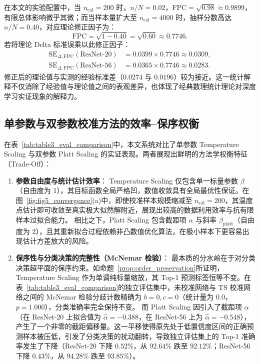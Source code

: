 在本文的实验配置中，当 $n_{\mathrm{cal}} = 200$ 时，$n/N = 0.02$，$\mathrm{FPC} = \sqrt{0.98} \approx 0.9899$，有限总体影响微乎其微；而当样本量扩大至 $n_{\mathrm{cal}} = 4000$ 时，抽样分数高达 $n/N = 0.40$，对应理论修正因子为：
\[
\mathrm{FPC} = \sqrt{1 - 0.40} = \sqrt{0.60} \approx 0.7746.
\]
若将理论 Delta 标准误乘以此修正因子：
\begin{align*}
\mathrm{SE}_{\Delta, \mathrm{FPC}}(\text{ResNet-20}) &= 0.0399 \times 0.7746 \approx 0.0309, \\
\mathrm{SE}_{\Delta, \mathrm{FPC}}(\text{ResNet-56}) &= 0.0365 \times 0.7746 \approx 0.0283.
\end{align*}
修正后的理论值与实测的经验标准差（$0.0274$ 与 $0.0196$）较为接近。这一统计解释不仅消除了经验值与理论值之间的表观差异，也体现了经典数理统计理论对深度学习实证现象的解释力。

\subsection{单参数与双参数校准方法的效率--保序权衡}

在表~\ref{tab:table3_eval_comparison}中，本文系统对比了单参数 Temperature Scaling 与双参数 Platt Scaling 的实证表现。两者展现出鲜明的方法学权衡特征（Trade-Off）：

\begin{enumerate}
\item \textbf{参数自由度与统计估计效率}：
Temperature Scaling 仅包含单一标量参数 $\beta$（自由度为 1），其目标函数全局严格凹，数值收敛具有全局最优性保证。在图~\ref{fig:fig5_convergence}(a)中，即使校准样本规模缩减至 $n_{\mathrm{cal}} = 200$，其温度点估计即可收敛至真实极大似然解附近，展现出较高的数据利用效率与抗有限样本过拟合能力。
相比之下，Platt Scaling 包含截距项 $\alpha$ 与斜率 $\beta_{\mathrm{platt}}$（自由度为 2），且其重新拟合过程依赖非凸数值优化算法，在极小样本下更容易出现估计方差放大的风险。
\item \textbf{保序性与分类决策的完整性（McNemar 检验）}：
最本质的分水岭在于对分类决策超平面的保序约束。如命题~\ref{prop:order_preservation}所证明，Temperature Scaling 作为单调纯标量缩放，其 Top-1 预测标签恒等不变。在表~\ref{tab:table3_eval_comparison}的独立评估集中，未校准网络与 TS 校准网络之间的 McNemar 检验分歧计数精确为 $b = 0, c = 0$（统计量为 $0.0$，$p = 1.000$），分类准确率完全保持不变。
而 Platt Scaling 因引入了截距项 $\alpha$（在 ResNet-20 上拟合值为 $\hat\alpha = -0.388$，在 ResNet-56 上为 $\hat\alpha = -0.548$），产生了一个非零的截距偏移量。这一平移使得原先处于低置信度区间的正确预测样本被压低，引发了分类决策的扰动翻转，导致独立评估集上的 Top-1 准确率发生了下降（ResNet-20 下降 $0.52\%$，从 $92.64\%$ 跌至 $92.12\%$；ResNet-56 下降 $0.43\%$，从 $94.28\%$ 跌至 $93.85\%$）。
\end{enumerate}

